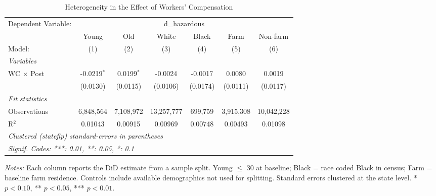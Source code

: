 
\begin{table}[htbp]
   \caption{\label{tab:hetero} Heterogeneity in the Effect of Workers' Compensation}
   \centering
   \footnotesize
   \setlength{\tabcolsep}{4pt}
   \begin{tabular}{lcccccc}
      \tabularnewline \midrule \midrule
      Dependent Variable: & \multicolumn{6}{c}{d\_hazardous}\\
                        & Young         & Old          & White      & Black    & Farm      & Non-farm \\   
      Model:            & (1)           & (2)          & (3)        & (4)      & (5)       & (6)\\  
      \midrule
      \emph{Variables}\\
      WC $\times$ Post  & -0.0219$^{*}$ & 0.0199$^{*}$ & -0.0024    & -0.0017  & 0.0080    & 0.0019\\   
                        & (0.0130)      & (0.0115)     & (0.0106)   & (0.0174) & (0.0111)  & (0.0117)\\   
      \midrule
      \emph{Fit statistics}\\
      Observations      & 6,848,564     & 7,108,972    & 13,257,777 & 699,759  & 3,915,308 & 10,042,228\\  
      R$^2$             & 0.01043       & 0.00915      & 0.00969    & 0.00748  & 0.00493   & 0.01098\\  
      \midrule \midrule
      \multicolumn{7}{l}{\emph{Clustered (statefip) standard-errors in parentheses}}\\
      \multicolumn{7}{l}{\emph{Signif. Codes: ***: 0.01, **: 0.05, *: 0.1}}\\
   \end{tabular}
   
   \par \raggedright 
   \textit{Notes:} Each column reports the DiD estimate from a sample split. Young $\leq$ 30 at baseline; Black = race coded Black in census; Farm = baseline farm residence. Controls include available demographics not used for splitting. Standard errors clustered at the state level. * $p < 0.10$, ** $p < 0.05$, *** $p < 0.01$.
\end{table}


